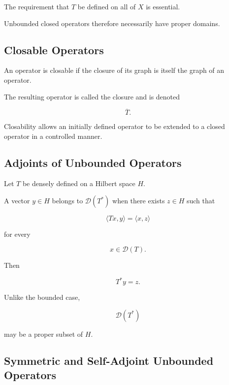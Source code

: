 The requirement that \(T\) be defined on all of \(X\) is essential.

Unbounded closed operators therefore necessarily have proper domains.

\subsection{Closable Operators}
\label{subsec:closable-operators}

An operator is closable if the closure of its graph is itself the graph
of an operator.

The resulting operator is called the closure and is denoted

\[
\boxed{
\overline{T}.
}
\]

Closability allows an initially defined operator to be extended to a
closed operator in a controlled manner.

\subsection{Adjoints of Unbounded Operators}
\label{subsec:unbounded-adjoints}

Let \(T\) be densely defined on a Hilbert space \(H\).

A vector \(y\in H\) belongs to \(\mathcal{D}(T^*)\) when there exists
\(z\in H\) such that

\[
\boxed{
\langle Tx,y\rangle
=
\langle x,z\rangle
}
\]

for every

\[
x\in\mathcal{D}(T).
\]

Then

\[
\boxed{
T^*y=z.
}
\]

Unlike the bounded case,

\[
\mathcal{D}(T^*)
\]

may be a proper subset of \(H\).

\subsection{Symmetric and Self-Adjoint Unbounded Operators}
\label{subsec:symmetric-selfadjoint-unbounded}

